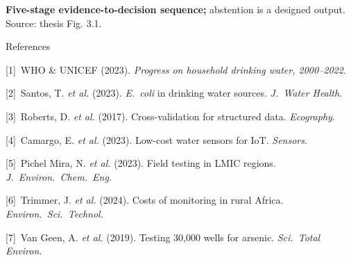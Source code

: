 \documentclass[
	landscape,   %
	a1papersize, %
	print,       %
]{ImperialPoster}
\newcommand{\capfont}{\fontsize{16pt}{19pt}\selectfont}
\newcommand{\reffont}{\fontsize{14pt}{15.5pt}\selectfont}
\newcommand{\railhead}[1]{%
	{\ImperialSansSemiBold\fontsize{30pt}{33pt}\selectfont\color{ICLDarkBlue}#1\par}%
	\vspace{1.2mm}{\color{ICLBlue}\rule{\linewidth}{1.5pt}}\par\vspace{1.5mm}}
\begin{document}
\begin{minipage}[t]{18.5cm}
	\vspace{1.6mm}
	{\capfont\textbf{Five-stage evidence-to-decision sequence;} abstention is a designed output. \textcolor{black!55}{Source: thesis Fig. 3.1.}\par}

	\vspace{1mm}

	\railhead{References}

	{\reffont\raggedright
	\begin{minipage}[t]{8.6cm}\raggedright\vspace{0pt}
	[1]~WHO \& UNICEF (2023). \textit{Progress on household drinking water, 2000--2022}.\par\vspace{1mm}
	[2]~Santos, T. \textit{et al.} (2023). \textit{E.\ coli} in drinking water sources. \textit{J.\ Water Health}.\par\vspace{1mm}
	[3]~Roberts, D. \textit{et al.} (2017). Cross-validation for structured data. \textit{Ecography}.\par\vspace{1mm}
	[4]~Camargo, E. \textit{et al.} (2023). Low-cost water sensors for IoT. \textit{Sensors}.\par
	\end{minipage}\hspace{0.7cm}%
	\begin{minipage}[t]{8.6cm}\raggedright\vspace{0pt}
	[5]~Pichel Mira, N. \textit{et al.} (2023). Field testing in LMIC regions. \textit{J.\ Environ.\ Chem.\ Eng.}\par\vspace{1mm}
	[6]~Trimmer, J. \textit{et al.} (2024). Costs of monitoring in rural Africa. \textit{Environ.\ Sci.\ Technol.}\par\vspace{1mm}
	[7]~Van Geen, A. \textit{et al.} (2019). Testing 30,000 wells for arsenic. \textit{Sci.\ Total Environ.}\par
	\end{minipage}
	}

\end{minipage}%
\hspace{1.0cm}%
\end{document}

